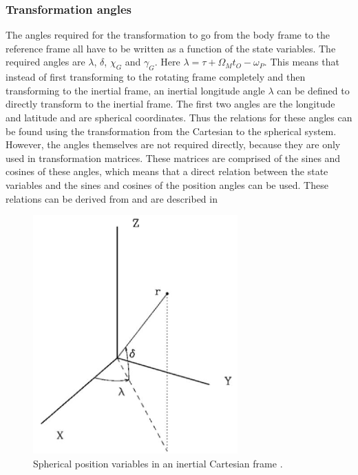 \subsubsection{Transformation angles}
\label{subsubsec:tsiTransAngl}
The angles required for the transformation to go from the body frame to the reference frame all have to be written as a function of the state variables. The required angles are $\lambda$, $\delta$, $\chi_{G}$ and $\gamma_{G}$. Here $\lambda = \tau + \Omega_{M}t_{O}-\omega_{P}$. This means that instead of first transforming to the rotating frame completely and then transforming to the inertial frame, an inertial longitude angle $\lambda$ can be defined to directly transform to the inertial frame. The first two angles are the longitude and latitude and are spherical coordinates. Thus the relations for these angles can be found using the transformation from the Cartesian to the spherical system. However, the angles themselves are not required directly, because they are only used in transformation matrices. These matrices are comprised of the sines and cosines of these angles, which means that a direct relation between the state variables and the sines and cosines of the position angles can be used. These relations can be derived from  and are described in 


 \begin{figure}[!ht]
\centering
\includegraphics[width=0.7\textwidth]{figures/reference_frames/sphertocart_noomen2013basic.jpg}
\caption{Spherical position variables in an inertial Cartesian frame \citep{noomen2013basic}.}
\label{fig:sphertocart_noomen2013basic}
\end{figure}

